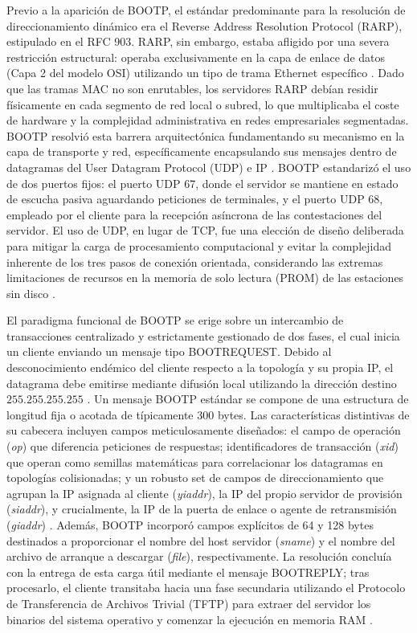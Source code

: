 \documentclass[a4paper,12pt]{article}
\begin{document}
Previo a la aparición de BOOTP, el estándar predominante para la resolución de direccionamiento dinámico era el Reverse Address Resolution Protocol (RARP), estipulado en el RFC 903. RARP, sin embargo, estaba afligido por una severa restricción estructural: operaba exclusivamente en la capa de enlace de datos (Capa 2 del modelo OSI) utilizando un tipo de trama Ethernet específico \cite{ionos_bootp}. Dado que las tramas MAC no son enrutables, los servidores RARP debían residir físicamente en cada segmento de red local o subred, lo que multiplicaba el coste de hardware y la complejidad administrativa en redes empresariales segmentadas. BOOTP resolvió esta barrera arquitectónica fundamentando su mecanismo en la capa de transporte y red, específicamente encapsulando sus mensajes dentro de datagramas del User Datagram Protocol (UDP) e IP \cite{ionos_bootp, rfc951}. BOOTP estandarizó el uso de dos puertos fijos: el puerto UDP 67, donde el servidor se mantiene en estado de escucha pasiva aguardando peticiones de terminales, y el puerto UDP 68, empleado por el cliente para la recepción asíncrona de las contestaciones del servidor. El uso de UDP, en lugar de TCP, fue una elección de diseño deliberada para mitigar la carga de procesamiento computacional y evitar la complejidad inherente de los tres pasos de conexión orientada, considerando las extremas limitaciones de recursos en la memoria de solo lectura (PROM) de las estaciones sin disco \cite{rfc951, ionos_bootp}.

El paradigma funcional de BOOTP se erige sobre un intercambio de transacciones centralizado y estrictamente gestionado de dos fases, el cual inicia un cliente enviando un mensaje tipo BOOTREQUEST. Debido al desconocimiento endémico del cliente respecto a la topología y su propia IP, el datagrama debe emitirse mediante difusión local utilizando la dirección destino $255.255.255.255$ \cite{ionos_bootp}. Un mensaje BOOTP estándar se compone de una estructura de longitud fija o acotada de típicamente 300 bytes. Las características distintivas de su cabecera incluyen campos meticulosamente diseñados: el campo de operación (\textit{op}) que diferencia peticiones de respuestas; identificadores de transacción (\textit{xid}) que operan como semillas matemáticas para correlacionar los datagramas en topologías colisionadas; y un robusto set de campos de direccionamiento que agrupan la IP asignada al cliente (\textit{yiaddr}), la IP del propio servidor de provisión (\textit{siaddr}), y crucialmente, la IP de la puerta de enlace o agente de retransmisión (\textit{giaddr}) \cite{ionos_bootp, rfc951}. Además, BOOTP incorporó campos explícitos de 64 y 128 bytes destinados a proporcionar el nombre del host servidor (\textit{sname}) y el nombre del archivo de arranque a descargar (\textit{file}), respectivamente. La resolución concluía con la entrega de esta carga útil mediante el mensaje BOOTREPLY; tras procesarlo, el cliente transitaba hacia una fase secundaria utilizando el Protocolo de Transferencia de Archivos Trivial (TFTP) para extraer del servidor los binarios del sistema operativo y comenzar la ejecución en memoria RAM \cite{rfc951}.
\end{document}
